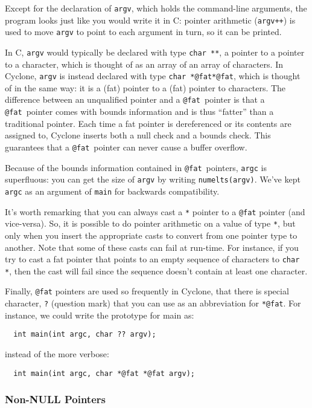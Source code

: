 Except for the declaration of \texttt{argv}, which holds the
command-line arguments, the program looks just like you would write it
in C: pointer arithmetic (\texttt{argv++}) is used to move
\texttt{argv} to point to each argument in turn, so it can be printed.

In C, \texttt{argv} would typically be declared with type \texttt{char
  **}, a pointer to a pointer to a character, which is thought of as
an array of an array of characters.  In Cyclone, \texttt{argv} is
instead declared with type \texttt{char *@fat*@fat}, which is thought of in
the same way: it is a (fat) pointer to a (fat) pointer to characters.  The
difference between an unqualified pointer and a \texttt{@fat}\ pointer is
that a \texttt{@fat}\ pointer comes with bounds information and is thus
``fatter'' than a traditional pointer.  Each time a
fat pointer is dereferenced or its contents are assigned to,
Cyclone inserts both a null check and a bounds check.  This
guarantees that a \texttt{@fat}\ pointer can never cause a buffer
overflow.

Because of the bounds information contained in \texttt{@fat}\ pointers,
\texttt{argc} is superfluous: you can get the size of \texttt{argv} by
writing \texttt{numelts(argv)}.  We've kept \texttt{argc} as an argument
of \texttt{main} for backwards compatibility.

It's worth remarking that you can always cast a \texttt{*} pointer
to a \texttt{@fat} pointer (and vice-versa).  So, it is possible to do
pointer arithmetic on a value of type \texttt{*}, but only when you
insert the appropriate casts to convert from one pointer type to 
another.  Note that some of these casts can fail at run-time.  For
instance, if you try to cast a fat pointer that points to an empty 
sequence of characters to \texttt{char *}, then the cast will fail
since the sequence doesn't contain at least one character. 

Finally, \texttt{@fat} pointers are used so frequently in Cyclone,
that there is special character, \texttt{?} (question mark) that you 
can use as an abbreviation for \texttt{*@fat}.  For instance, we could
write the prototype for main as:
\begin{verbatim}
  int main(int argc, char ?? argv);
\end{verbatim}
instead of the more verbose:
\begin{verbatim}
  int main(int argc, char *@fat *@fat argv);
\end{verbatim}

\subsubsection*{Non-NULL Pointers}


